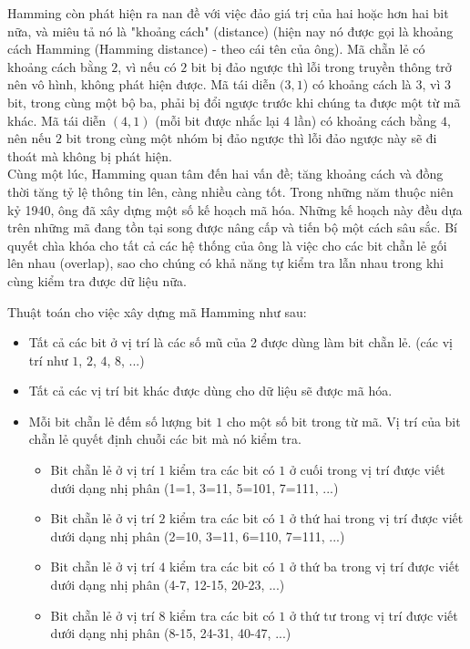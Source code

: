 \documentclass[12pt,a4paper]{article}
\begin{document}
Hamming còn phát hiện ra nan đề với việc đảo giá trị của hai hoặc hơn hai bit nữa, và miêu tả nó là "khoảng cách" (distance) (hiện nay nó được gọi là khoảng cách Hamming (Hamming distance) - theo cái tên của ông). Mã chẵn lẻ có khoảng cách bằng $2$, vì nếu có $2$ bit bị đảo ngược thì lỗi trong truyền thông trở nên vô hình, không phát hiện được. Mã tái diễn $(3,1$) có khoảng cách là $3$, vì $3$ bit, trong cùng một bộ ba, phải bị đổi ngược trước khi chúng ta được một từ mã khác. Mã tái diễn $(4,1)$ (mỗi bit được nhắc lại $4$ lần) có khoảng cách bằng $4$, nên nếu $2$ bit trong cùng một nhóm bị đảo ngược thì lỗi đảo ngược này sẽ đi thoát mà không bị phát hiện.\\

Cùng một lúc, Hamming quan tâm đến hai vấn đề; tăng khoảng cách và đồng thời tăng tỷ lệ thông tin lên, càng nhiều càng tốt. Trong những năm thuộc niên kỷ 1940, ông đã xây dựng một số kế hoạch mã hóa. Những kế hoạch này đều dựa trên những mã đang tồn tại song được nâng cấp và tiến bộ một cách sâu sắc. Bí quyết chìa khóa cho tất cả các hệ thống của ông là việc cho các bit chẵn lẻ gối lên nhau (overlap), sao cho chúng có khả năng tự kiểm tra lẫn nhau trong khi cùng kiểm tra được dữ liệu nữa.

Thuật toán cho việc xây dựng mã Hamming như sau:
\begin{itemize}
\item Tất cả các bit ở vị trí là các số mũ của 2 được dùng làm bit chẵn lẻ. (các vị trí như $1$, $2$, $4$, $8$, ...)
\item Tất cả các vị trí bit khác được dùng cho dữ liệu sẽ được mã hóa.
\item Mỗi bit chẵn lẻ đếm số lượng bit $1$ cho một số bit trong từ mã. Vị trí của bit chẵn lẻ quyết định chuỗi các bit mà nó kiểm tra.
\begin{itemize}
     \item Bit chẵn lẻ ở vị trí $1$ kiểm tra các bit có $1$ ở cuối trong vị trí được viết dưới dạng nhị phân (1=1, 3=11, 5=101, 7=111, ...) 
     \item Bit chẵn lẻ ở vị trí $2$ kiểm tra các bit có $1$ ở thứ hai trong vị trí được viết dưới dạng nhị phân (2=10, 3=11, 6=110, 7=111, ...)
     \item Bit chẵn lẻ ở vị trí $4$ kiểm tra các bit có $1$ ở thứ ba trong vị trí được viết dưới dạng nhị phân (4-7, 12-15, 20-23, ...)
     \item Bit chẵn lẻ ở vị trí $8$ kiểm tra các bit có $1$ ở thứ tư trong vị trí được viết dưới dạng nhị phân (8-15, 24-31, 40-47, ...)
\end{itemize}

\end{itemize}
\end{document}
